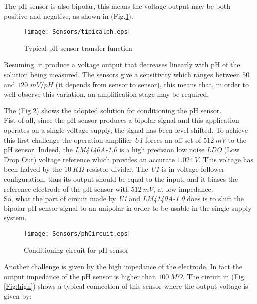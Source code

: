 The pH sensor is also bipolar, this means the voltage output may be both positive and negative, as shown in (Fig.\ref{Fig:typicalph}).\\

\begin{figure}[h]
	\centering
	\texttt{[image: Sensors/tipicalph.eps]}
	\caption{Typical pH-sensor transfer function}
	\label{Fig:typicalph}
	
\end{figure}

Resuming, it produce a voltage output that decreases linearly with pH of the solution being measured. The sensors give a sensitivity which ranges between $50$ and $120$ $mV/pH$ (it depends from sensor to sensor), this means that, in order to well observe this variation, an amplification stage may be required.

The (Fig.\ref{Fig:circuitph}) shows the adopted solution for conditioning the pH sensor. \\
Fist of all, since the pH sensor produces a bipolar signal and this application operates on a single voltage supply, the signal has been level shifted. To achieve this first challenge the operation amplifier \textit{U1} forces an off-set of $512\ mV$ to the pH sensor. Indeed, the \textit{LM4140A-1.0} is a high precision low noise \textit{LDO} (Low Drop Out) voltage reference which provides an accurate $1.024\ V$. This voltage has been halved by the $10\ K\Omega$ resistor divider. The \textit{U1} is in voltage follower configuration, thus its output should be equal to the input, and it biases the reference electrode of the pH sensor with $512\ mV$, at low impedance.\\
So, what the part of circuit made by \textit{U1} and \textit{LM4140A-1.0} does is to shift the bipolar pH sensor signal to an unipolar in order to be usable in the single-supply system.
 
\begin{figure}[h]
	\centering
	\texttt{[image: Sensors/phCircuit.eps]}
	\caption{Conditioning circuit for pH sensor}
	\label{Fig:circuitph}
	
\end{figure}

Another challenge is given by the high impedance of the electrode. In fact the output impedance of the pH sensor is higher than $100\ M\Omega$. The circuit in (Fig.\ref{Fig:high}) shows a typical connection of this sensor where the output voltage is given by:

